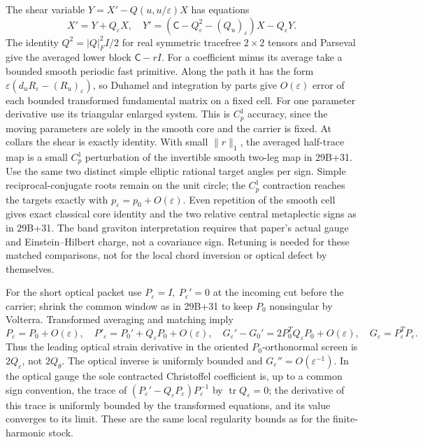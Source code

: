 \documentclass[11pt]{article}
\begin{document}
The shear variable \(Y=X'-Q(u,u/\varepsilon)X\) has equations
\[
X'=Y+Q_\varepsilon X,\quad
Y'=(\mathsf C-Q_\varepsilon^2-(Q_u)_\varepsilon)X-Q_\varepsilon Y.
\]
The identity \(Q^2=|Q|_F^2I/2\) for real symmetric tracefree \(2\times2\) tensors and Parseval give the averaged lower block \(\mathsf C-rI\). For a coefficient minus its average take a bounded smooth periodic fast primitive. Along the path it has the form \(\varepsilon(d_u R_\varepsilon-(R_u)_\varepsilon)\), so Duhamel and integration by parts give \(O(\varepsilon)\) error of each bounded transformed fundamental matrix on a fixed cell. For one parameter derivative use its triangular enlarged system. This is \(C^1_p\) accuracy, since the moving parameters are solely in the smooth core and the carrier is fixed. At collars the shear is exactly identity. With small \(\|r\|_1\), the averaged half-trace map is a small \(C^1_p\) perturbation of the invertible smooth two-leg map in 29B+31. Use the same two distinct simple elliptic rational target angles per sign. Simple reciprocal-conjugate roots remain on the unit circle; the \(C^1_p\) contraction reaches the targets exactly with \(p_\varepsilon=p_0+O(\varepsilon)\). Even repetition of the smooth cell gives exact classical core identity and the two relative central metaplectic signs as in 29B+31. The band graviton interpretation requires that paper's actual gauge and Einstein--Hilbert charge, not a covariance sign. Retuning is needed for these matched comparisons, not for the local chord inversion or optical defect by themselves.

For the short optical packet use \(P_\varepsilon=I,\ P_\varepsilon'=0\) at the incoming cut before the carrier; shrink the common window as in 29B+31 to keep \(P_0\) nonsingular by Volterra. Transformed averaging and matching imply
\[
P_\varepsilon=P_0+O(\varepsilon),\quad
P'_\varepsilon=P_0'+Q_\varepsilon P_0+O(\varepsilon),\quad
G_\varepsilon'-G_0'=2P_0^TQ_\varepsilon P_0+O(\varepsilon),
\quad G_\varepsilon=P_\varepsilon^TP_\varepsilon .
\]
Thus the leading optical strain derivative in the oriented \(P_0\)-orthonormal screen is \(2Q_\varepsilon\), not \(2Q_\theta\). The optical inverse is uniformly bounded and \(G_\varepsilon''=O(\varepsilon^{-1})\). In the optical gauge the sole contracted Christoffel coefficient is, up to a common sign convention, the trace of \((P_\varepsilon'-Q_\varepsilon P_\varepsilon)P_\varepsilon^{-1}\) by \(\operatorname{tr}Q_\varepsilon=0\); the derivative of this trace is uniformly bounded by the transformed equations, and its value converges to its limit. These are the same local regularity bounds as for the finite-harmonic stock.
\end{document}
